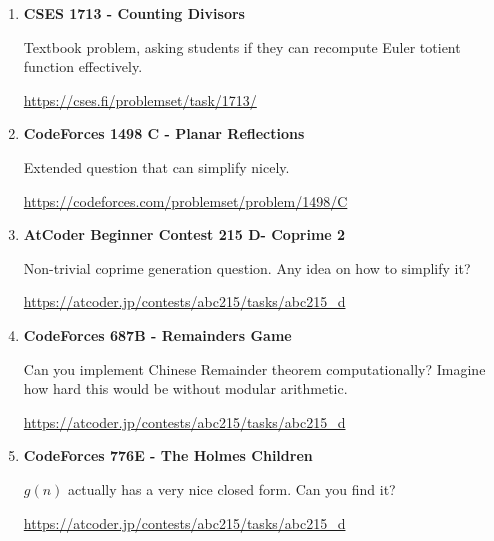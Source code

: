 \documentclass[11pt]{article}
\begin{document}
\begin{enumerate}

    \item \textbf{CSES 1713 - Counting Divisors}
    
    Textbook problem, asking students if they can recompute Euler totient function effectively.

    \vspace{0.3em}
    {\small\url{https://cses.fi/problemset/task/1713/}}

    \vspace{0.8em}
    \item \textbf{CodeForces 1498 C - Planar Reflections}
    
    Extended question that can simplify nicely.

    \vspace{0.3em}
    {\small\url{https://codeforces.com/problemset/problem/1498/C}}

    \vspace{0.8em}
    \item \textbf{AtCoder Beginner Contest 215 D- Coprime 2}
    
    Non-trivial coprime generation question. Any idea on how to simplify it?

    \vspace{0.3em}
    {\small\url{https://atcoder.jp/contests/abc215/tasks/abc215_d}}

    \vspace{0.8em}
    \item \textbf{CodeForces 687B - Remainders Game}
    
    Can you implement Chinese Remainder theorem computationally? Imagine how hard this would be without modular arithmetic.
    
    \vspace{0.3em}
    {\small\url{https://atcoder.jp/contests/abc215/tasks/abc215_d}}

    \vspace{0.8em}
    \item \textbf{CodeForces 776E - The Holmes Children}
    
    $g(n)$ actually has a very nice closed form. Can you find it?
    
    \vspace{0.3em}
    {\small\url{https://atcoder.jp/contests/abc215/tasks/abc215_d}}


\end{enumerate}

\vspace{1em}
\end{document}
